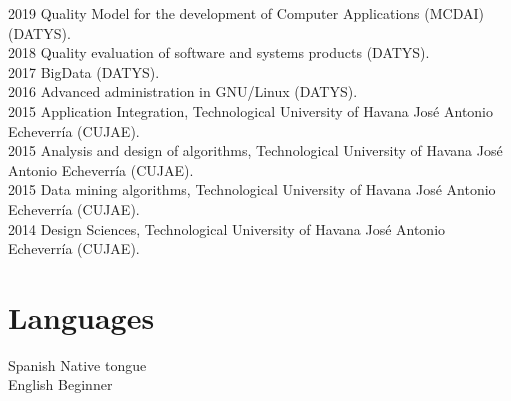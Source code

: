 \documentclass[letterpaper]{twentysecondcv} %
\begin{document}
\begin{twenty} %
\twentyitem
    	{2019}
		{}
        {Quality Model for the development of Computer Applications (MCDAI) (DATYS).}
        {}
        {}
        {}
        \\
\twentyitem
    	{2018}
		{}
        {Quality evaluation of software and systems products (DATYS).}
        {}
        {}
        {}
        \\
\twentyitem
    	{2017}
		{}
        {BigData (DATYS).}
        {}
        {}
        {}
        \\
\twentyitem
    	{2016}
		{}
        {Advanced administration in GNU/Linux (DATYS).}
        {}
        {}
        {}
        \\
\twentyitem
    	{2015}
		{}
        {Application Integration, Technological University of Havana José Antonio
Echeverría (CUJAE).}
        {}
        {}
        {}
        \\
\twentyitem
    	{2015}
		{}
        {Analysis and design of algorithms, Technological University of Havana José Antonio
Echeverría (CUJAE).}
        {}
        {}
        {}
        \\
\twentyitem
    	{2015}
		{}
        {Data mining algorithms, Technological University of Havana José Antonio
Echeverría (CUJAE).}
        {}
        {}
        {}
        \\
\twentyitem
    	{2014}
		{}
        {Design Sciences, Technological University of Havana José Antonio
Echeverría (CUJAE).}
        {}
        {}
        {}

\end{twenty}
\section{Languages}

\begin{twenty} %
\twentyitem
    	{Spanish}
		{}
        {Native tongue}
        {}
        {}
        {}
        \\
	\twentyitem
    	{English}
		{}
        {Beginner}
        {}
        {}
        {}


\end{twenty}
\end{document}
